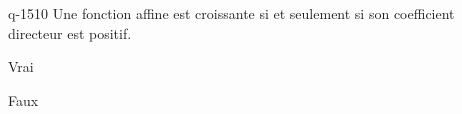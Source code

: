 \begin{truefalse}{q-1510}
Une fonction affine est croissante si et seulement si son coefficient directeur est positif.
\item* Vrai
\item Faux
\end{truefalse}

